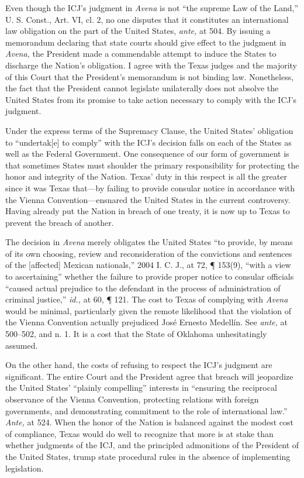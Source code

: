 {{  Even though the ICJ's judgment in \emph{Avena} is not ``the supreme
Law of the Land,'' U. S. Const., Art. VI, cl. 2, no one disputes
that it constitutes an international law obligation on the part of the
United States, \emph{ante,} at 504. By issuing a memorandum declaring
that state courts should give effect to the judgment in \emph{Avena,}
the President made a commendable attempt to induce the States to
discharge the Nation's obligation. I agree with the Texas judges and
the majority of this Court that the President's memorandum is not
binding law. Nonetheless, the fact that the President cannot legislate
unilaterally does not absolve the United States from its promise to take
action necessary to comply with the ICJ's judgment.

  Under the express terms of the Supremacy Clause, the United States'
obligation to ``undertak[e] to comply'' with the ICJ's decision
falls on each of the States as well as the Federal Government. One
consequence of our form of government is that sometimes States must
shoulder the primary responsibility for protecting the honor and
integrity of the Nation. Texas' duty in this respect is all the
greater since it was Texas that---by failing to provide consular notice
in accordance with the Vienna Convention---ensnared the United States in
the current controversy. Having already put the Nation in breach of one
treaty, it is now up to Texas to prevent the breach of another.

  The decision in \emph{Avena} merely obligates the United States ``to
provide, by means of its own choosing, review and reconsideration of the
convictions and sentences of the [affected] Mexican nationals,'' 2004
I. C. J., at 72, ¶ 153(9), ``with a view to ascertaining'' whether
the failure to provide proper notice to consular officials ``caused
actual prejudice to the defendant in the process of administration of
criminal justice,'' \emph{id.,} at 60, ¶ 121. The cost to Texas
of complying with \emph{Avena} would be minimal, particularly given
the remote likelihood that the violation of the Vienna Convention
actually prejudiced José \newpage  Ernesto Medellín. See \emph{ante,}
at 500--502, and n. 1. It is a cost that the State of Oklahoma
unhesitatingly assumed.\footnotemark[4]

  On the other hand, the costs of refusing to respect the ICJ's
judgment are significant. The entire Court and the President agree that
breach will jeopardize the United States' ``plainly compelling''
interests in ``ensuring the reciprocal observance of the Vienna
Convention, protecting relations with foreign governments, and
demonstrating commitment to the role of international law.''
\emph{Ante,} at 524. When the honor of the Nation is balanced against
the modest cost of compliance, Texas would do well to recognize that
more is at stake than whether judgments of the ICJ, and the principled
admonitions of the President of the United States, trump state
procedural rules in the absence of implementing legislation.

}}
